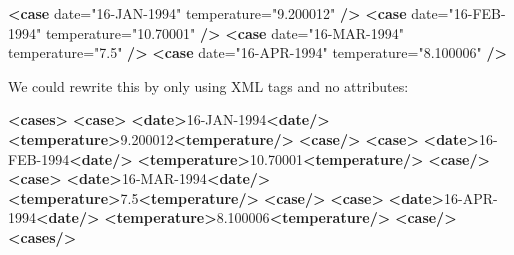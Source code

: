 \documentclass[
  12pt,
]{style/krantz}
\newenvironment{Shaded}{\begin{snugshade}}{\end{snugshade}}
\newcommand{\KeywordTok}[1]{\textcolor[rgb]{0.13,0.29,0.53}{\textbf{#1}}}
\newcommand{\NormalTok}[1]{#1}
\newcommand{\OtherTok}[1]{\textcolor[rgb]{0.56,0.35,0.01}{#1}}
\newcommand{\StringTok}[1]{\textcolor[rgb]{0.31,0.60,0.02}{#1}}
\begin{document}
\begin{Shaded}
\begin{Highlighting}[]
    \KeywordTok{\textless{}case}\OtherTok{ date=}\StringTok{"16{-}JAN{-}1994"}\OtherTok{ temperature=}\StringTok{"9.200012"} \KeywordTok{/\textgreater{}}
    \KeywordTok{\textless{}case}\OtherTok{ date=}\StringTok{"16{-}FEB{-}1994"}\OtherTok{ temperature=}\StringTok{"10.70001"} \KeywordTok{/\textgreater{}}
    \KeywordTok{\textless{}case}\OtherTok{ date=}\StringTok{"16{-}MAR{-}1994"}\OtherTok{ temperature=}\StringTok{"7.5"} \KeywordTok{/\textgreater{}}
    \KeywordTok{\textless{}case}\OtherTok{ date=}\StringTok{"16{-}APR{-}1994"}\OtherTok{ temperature=}\StringTok{"8.100006"} \KeywordTok{/\textgreater{}}
\end{Highlighting}
\end{Shaded}

We could rewrite this by only using XML tags and no attributes:

\begin{Shaded}
\begin{Highlighting}[]
  \KeywordTok{\textless{}cases\textgreater{}}    
    \KeywordTok{\textless{}case\textgreater{}}
      \KeywordTok{\textless{}date\textgreater{}}\NormalTok{16{-}JAN{-}1994}\KeywordTok{\textless{}date/\textgreater{}}
      \KeywordTok{\textless{}temperature\textgreater{}}\NormalTok{9.200012}\KeywordTok{\textless{}temperature/\textgreater{}}
    \KeywordTok{\textless{}case/\textgreater{}}
    \KeywordTok{\textless{}case\textgreater{}}
      \KeywordTok{\textless{}date\textgreater{}}\NormalTok{16{-}FEB{-}1994}\KeywordTok{\textless{}date/\textgreater{}}
      \KeywordTok{\textless{}temperature\textgreater{}}\NormalTok{10.70001}\KeywordTok{\textless{}temperature/\textgreater{}}
    \KeywordTok{\textless{}case/\textgreater{}}
    \KeywordTok{\textless{}case\textgreater{}}
      \KeywordTok{\textless{}date\textgreater{}}\NormalTok{16{-}MAR{-}1994}\KeywordTok{\textless{}date/\textgreater{}}
      \KeywordTok{\textless{}temperature\textgreater{}}\NormalTok{7.5}\KeywordTok{\textless{}temperature/\textgreater{}}
    \KeywordTok{\textless{}case/\textgreater{}}
    \KeywordTok{\textless{}case\textgreater{}}
      \KeywordTok{\textless{}date\textgreater{}}\NormalTok{16{-}APR{-}1994}\KeywordTok{\textless{}date/\textgreater{}}
      \KeywordTok{\textless{}temperature\textgreater{}}\NormalTok{8.100006}\KeywordTok{\textless{}temperature/\textgreater{}}
    \KeywordTok{\textless{}case/\textgreater{}}
  \KeywordTok{\textless{}cases/\textgreater{}}
\end{Highlighting}
\end{Shaded}
\end{document}
